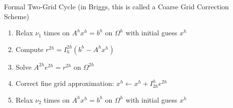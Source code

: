 \documentclass[11pt]{beamer}
\begin{document}
\begin{frame}{Formal Two-Grid Cycle}
  (in Briggs, this is called a Coarse Grid Correction Scheme)
  \begin{enumerate}
  \item Relax \(\nu_1\) times on \(A^h x^h = b^h\) on \(\Omega^h\) with initial guess
    \(x^h\)
  \item Compute \(r^{2h} = I_h^{2h}(b^h - A^h x^h)\)
  \item Solve \(A^{2h} e^{2h} = r^{2h}\) on \(\Omega^{2h}\)
  \item Correct fine grid approximation: \(x^h \leftarrow x^h + I_{2h}^h e^{2h}\)
  \item Relax \(\nu_2\) times on \(A^h x^h = b^h\) on \(\Omega^h\) with initial guess
    \(x^h\)
  \end{enumerate}
\end{frame}
\end{document}
